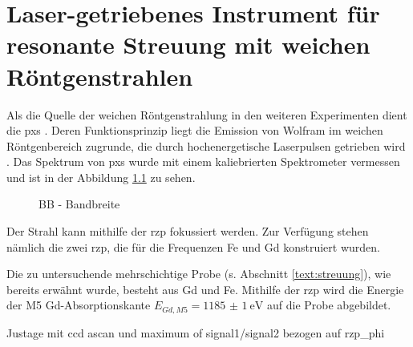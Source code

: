 \chapter{Laser-getriebenes Instrument für resonante Streuung mit weichen Röntgenstrahlen}
\label{text:quelle_roentgen}
Als die Quelle der weichen Röntgenstrahlung in den weiteren Experimenten dient die \gls{pxs} \cite{schick_laser-driven_2021}. Deren Funktionsprinzip liegt die Emission von Wolfram im weichen Röntgenbereich zugrunde, die durch hochenergetische Laserpulsen getrieben wird \cite{mantouvalou_high_2015}. Das Spektrum von \gls{pxs} wurde mit einem kaliebrierten Spektrometer vermessen und ist in der Abbildung \ref{fig:xps_spectrum} zu sehen.

\begin{figure}[H]
    \centering
    
    \caption{BB - Bandbreite}
    \label{fig:xps_spectrum}
\end{figure}
Der Strahl kann mithilfe der \gls{rzp} fokussiert werden. Zur Verfügung stehen nämlich die zwei \gls{rzp}, die für die Frequenzen Fe und Gd konstruiert wurden. 

Die zu untersuchende mehrschichtige Probe (s. Abschnitt \ref{text:streuung}), wie bereits erwähnt wurde, besteht aus Gd und Fe. Mithilfe der \gls{rzp} wird die Energie der M5 Gd-Absorptionskante $E_{Gd, M5} = \SI{1185(1)}{\eV}$ \cite[Abb. 6(a)]{prieto_x-ray_2005} auf die Probe abgebildet.

Justage mit ccd ascan und maximum of signal1/signal2 bezogen auf rzp\_phi 


